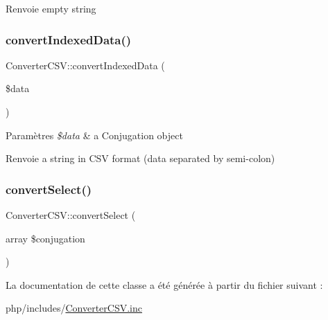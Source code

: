 \begin{DoxyReturn}{Renvoie}
empty string 
\end{DoxyReturn}
\hypertarget{class_converter_c_s_v_a66253359624a5be3a4f5df9761b980a7}{}\label{class_converter_c_s_v_a66253359624a5be3a4f5df9761b980a7} 
\subsubsection{\texorpdfstring{convert\+Indexed\+Data()}{convertIndexedData()}}
{\footnotesize\ttfamily Converter\+C\+S\+V\+::convert\+Indexed\+Data (\begin{DoxyParamCaption}\item[{}]{\$data }\end{DoxyParamCaption})}


\begin{DoxyParams}{Paramètres}
{\em \$data} & a Conjugation object \\
\hline
\end{DoxyParams}
\begin{DoxyReturn}{Renvoie}
a string in C\+SV format (data separated by semi-\/colon) 
\end{DoxyReturn}
\hypertarget{class_converter_c_s_v_a36a4e52151f3326f7ed9f347dd30cdeb}{}\label{class_converter_c_s_v_a36a4e52151f3326f7ed9f347dd30cdeb} 
\subsubsection{\texorpdfstring{convert\+Select()}{convertSelect()}}
{\footnotesize\ttfamily Converter\+C\+S\+V\+::convert\+Select (\begin{DoxyParamCaption}\item[{array}]{\$conjugation }\end{DoxyParamCaption})}



La documentation de cette classe a été générée à partir du fichier suivant \+:\begin{DoxyCompactItemize}
\item 
php/includes/\hyperlink{_converter_c_s_v_8inc}{Converter\+C\+S\+V.\+inc}\end{DoxyCompactItemize}
